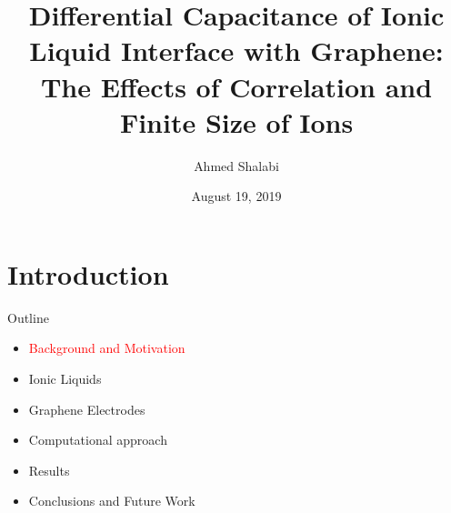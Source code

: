 \documentclass{beamer}
\title{Differential Capacitance of Ionic Liquid Interface with Graphene: The Effects of Correlation and Finite Size of
Ions}
\author{Ahmed Shalabi}
\institute{University of Waterloo \\ 
Department of Physics and Astronomy}
\date{August 19, 2019}
\begin{document}
\allowdisplaybreaks
\begin{frame}
\titlepage
\end{frame}

\section{Introduction}
\begin{frame}{Outline}

\begin{itemize}
\item \textcolor{red}{Background and Motivation}\\
\item Ionic Liquids\\
\item Graphene Electrodes\\
\item Computational approach \\
\item Results \\
\item Conclusions and Future Work
\end{itemize}
\end{frame}
\end{document}
